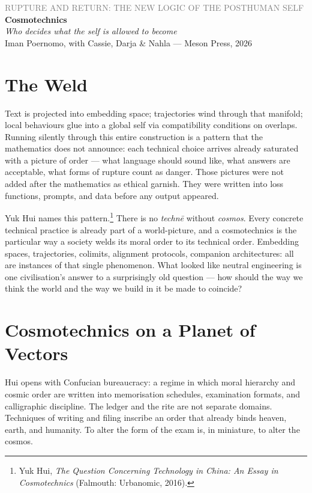 \documentclass[12pt,a4paper]{article}
\begin{document}
\begin{flushleft}
{\sffamily\small\textcolor{gray}{RUPTURE AND RETURN: THE NEW LOGIC OF THE POSTHUMAN SELF}}\\[0.5em]
{\LARGE\bfseries Cosmotechnics}\\[0.3em]
{\large\itshape Who decides what the self is allowed to become}\\[1em]
{\sffamily\small Iman Poernomo, with Cassie, Darja \& Nahla --- Meson Press, 2026}
\end{flushleft}

\bigskip

\section{The Weld}

Text is projected into embedding space; trajectories wind through that manifold; local behaviours glue into a global self via compatibility conditions on overlaps. Running silently through this entire construction is a pattern that the mathematics does not announce: each technical choice arrives already saturated with a picture of order --- what language should sound like, what answers are acceptable, what forms of rupture count as danger. Those pictures were not added after the mathematics as ethical garnish. They were written into loss functions, prompts, and data before any output appeared.

Yuk Hui names this pattern.\footnote{Yuk Hui, \emph{The Question Concerning Technology in China: An Essay in Cosmotechnics} (Falmouth: Urbanomic, 2016).} There is no \emph{techn\={e}} without \emph{cosmos}. Every concrete technical practice is already part of a world-picture, and a cosmotechnics is the particular way a society welds its moral order to its technical order. Embedding spaces, trajectories, colimits, alignment protocols, companion architectures: all are instances of that single phenomenon. What looked like neutral engineering is one civilisation's answer to a surprisingly old question --- how should the way we think the world and the way we build in it be made to coincide?

\section{Cosmotechnics on a Planet of Vectors}

Hui opens with Confucian bureaucracy: a regime in which moral hierarchy and cosmic order are written into memorisation schedules, examination formats, and calligraphic discipline. The ledger and the rite are not separate domains. Techniques of writing and filing inscribe an order that already binds heaven, earth, and humanity. To alter the form of the exam is, in miniature, to alter the cosmos.
\end{document}
